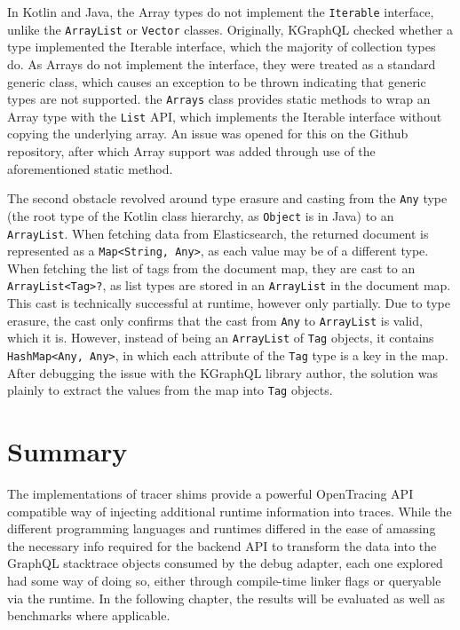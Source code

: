 \documentclass[12pt,pdftex,titlepage]{report}
\begin{document}
                \smallskip
                In Kotlin and Java, the Array types do not implement the \texttt{Iterable} interface, unlike the \texttt{ArrayList} or \texttt{Vector} classes. Originally, KGraphQL checked whether a type implemented the 
                Iterable interface, which the majority of collection types do. As Arrays do not implement the interface, they were treated as a standard generic class, which causes an exception to be thrown indicating 
                that generic types are not supported. the \texttt{Arrays} class provides static methods to wrap an Array type with the \texttt{List} API, which implements the Iterable interface without copying the 
                underlying array. An issue was opened for this on the Github repository, after which Array support was added through use of the aforementioned static method.

                The second obstacle revolved around type erasure and casting from the \texttt{Any} type (the root type of the Kotlin class hierarchy, as \texttt{Object} is in Java) to an \texttt{ArrayList}. When fetching data from 
                Elasticsearch, the returned document is represented as a \texttt{Map<String, Any>}, as each value may be of a different type. When fetching the list of tags from the document map, they are cast to an 
                \texttt{ArrayList<Tag>?}, as list types are stored in an \texttt{ArrayList} in the document map. This cast is technically successful at runtime, however only partially. Due to type erasure, the cast only 
                confirms that the cast from \texttt{Any} to \texttt{ArrayList} is valid, which it is. However, instead of being an \texttt{ArrayList} of \texttt{Tag} objects, it contains \texttt{HashMap<Any, Any>}, in which 
                each attribute of the \texttt{Tag} type is a key in the map. After debugging the issue with the KGraphQL library author, the solution was plainly to extract the values from the map into \texttt{Tag} objects.
            
        \section{Summary}
            The implementations of tracer shims provide a powerful OpenTracing API compatible way of injecting additional runtime information into traces. While the different programming languages and 
            runtimes differed in the ease of amassing the necessary info required for the backend API to transform the data into the GraphQL stacktrace objects consumed by the debug adapter, each one 
            explored had some way of doing so, either through compile-time linker flags or queryable via the runtime. In the following chapter, the results will be evaluated as well as benchmarks
            where applicable.
            
\end{document}
